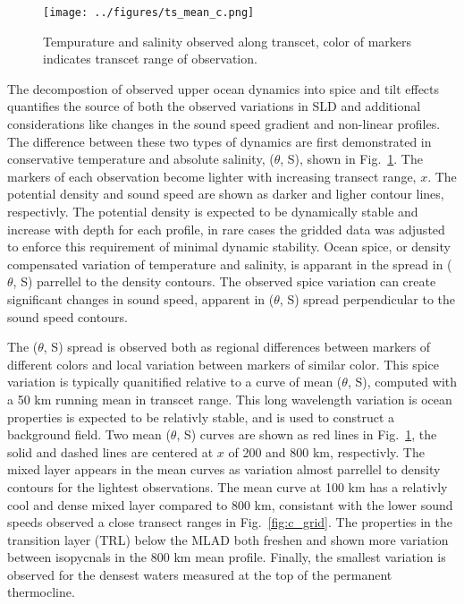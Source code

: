 \documentclass[preprint,NumberedRefs]{JASA}
\begin{document}
\begin{figure}
\texttt{[image: ../figures/ts\_mean\_c.png]}
\caption{\label{fig:ts_diagram}{Tempurature and salinity observed along transcet, color of markers indicates transcet range of observation.}}
\end{figure}
The decompostion of observed upper ocean dynamics into spice and tilt effects quantifies the source of both the observed variations in SLD and additional considerations like changes in the sound speed gradient and non-linear profiles. The difference between these two types of dynamics are first demonstrated in conservative temperature and absolute salinity, ($\theta$, S), shown in Fig.~\ref{fig:ts_diagram}. The markers of each observation become lighter with increasing transect range, $x$. The potential density and sound speed are shown as darker and ligher contour lines, respectivly. The potential density is expected to be dynamically stable and increase with depth for each profile, in rare cases the gridded data was adjusted to enforce this requirement of minimal dynamic stability\citep{barker2017stabilizing}. Ocean spice, or density compensated variation of temperature and salinity, is apparant in the spread in ($\theta$, S) parrellel to the density contours. The observed spice variation can create significant changes in sound speed, apparent in ($\theta$, S) spread perpendicular to the sound speed contours.

The ($\theta$, S) spread is observed both as regional differences between markers of different colors and local variation between markers of similar color. This spice variation is typically quanitified relative to a curve of mean ($\theta$, S), computed with a 50 km running mean in transcet range. This long wavelength variation is ocean properties is expected to be relativly stable, and is used to construct a background field\cite{dzieciuch2004}. Two mean ($\theta$, S) curves are shown as red lines in Fig.~\ref{fig:ts_diagram}, the solid and dashed lines are centered at $x$ of 200 and 800 km, respectivly. The mixed layer appears in the mean curves as variation almost parrellel to density contours for the lightest observations. The mean curve at 100 km has a relativly cool and dense mixed layer compared to 800 km, consistant with the lower sound speeds observed a close transect ranges in Fig.~\ref{fig:c_grid}. The properties in the transition layer (TRL) below the MLAD both freshen and shown more variation between isopycnals in the 800 km mean profile. Finally, the smallest variation is observed for the densest waters measured at the top of the permanent thermocline\cite{cole2010seasonal}.
\end{document}
